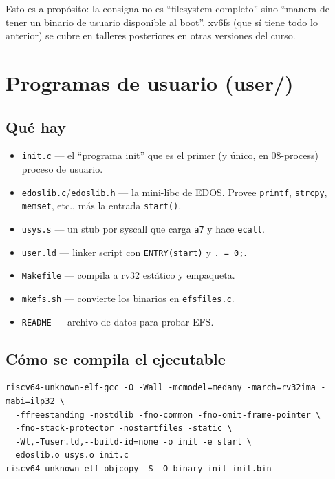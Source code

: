 \documentclass[11pt,a4paper]{article}
\begin{document}
Esto es a propósito: la consigna no es ``filesystem completo''
sino ``manera de tener un binario de usuario disponible al boot''.
xv6fs (que sí tiene todo lo anterior) se cubre en talleres
posteriores en otras versiones del curso.

\section{Programas de usuario (user/)}

\subsection*{Qué hay}

\begin{itemize}[nosep,leftmargin=*]
    \item \texttt{init.c} — el ``programa init'' que es el primer
        (y único, en 08-process) proceso de usuario.
    \item \texttt{edoslib.c}/\texttt{edoslib.h} — la mini-libc de
        EDOS. Provee \texttt{printf}, \texttt{strcpy}, \texttt{memset}, etc.,
        más la entrada \texttt{start()}.
    \item \texttt{usys.s} — un stub por syscall que carga
        \texttt{a7} y hace \texttt{ecall}.
    \item \texttt{user.ld} — linker script con \texttt{ENTRY(start)}
        y \texttt{. = 0;}.
    \item \texttt{Makefile} — compila a rv32 estático y empaqueta.
    \item \texttt{mkefs.sh} — convierte los binarios en
        \texttt{efsfiles.c}.
    \item \texttt{README} — archivo de datos para probar EFS.
\end{itemize}

\subsection*{Cómo se compila el ejecutable}

\begin{lstlisting}[style=shellstyle]
riscv64-unknown-elf-gcc -O -Wall -mcmodel=medany -march=rv32ima -mabi=ilp32 \
  -ffreestanding -nostdlib -fno-common -fno-omit-frame-pointer \
  -fno-stack-protector -nostartfiles -static \
  -Wl,-Tuser.ld,--build-id=none -o init -e start \
  edoslib.o usys.o init.c
riscv64-unknown-elf-objcopy -S -O binary init init.bin
\end{lstlisting}
\end{document}
